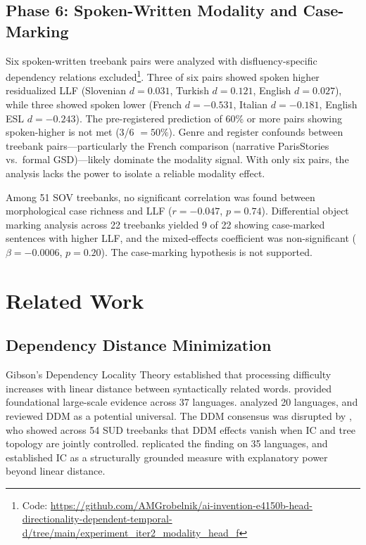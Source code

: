 \documentclass[11pt,letterpaper]{article}
\begin{document}
\subsection{Phase 6: Spoken-Written Modality and Case-Marking}

Six spoken-written treebank pairs were analyzed with disfluency-specific dependency relations excluded\footnote{Code: \url{https://github.com/AMGrobelnik/ai-invention-e4150b-head-directionality-dependent-temporal-d/tree/main/experiment_iter2_modality_head_f}}. Three of six pairs showed spoken higher residualized LLF (Slovenian $d = 0.031$, Turkish $d = 0.121$, English $d = 0.027$), while three showed spoken lower (French $d = -0.531$, Italian $d = -0.181$, English ESL $d = -0.243$). The pre-registered prediction of 60\% or more pairs showing spoken-higher is not met (3/6 $= 50\%$). Genre and register confounds between treebank pairs---particularly the French comparison (narrative ParisStories vs.\ formal GSD)---likely dominate the modality signal. With only six pairs, the analysis lacks the power to isolate a reliable modality effect.

Among 51 SOV treebanks, no significant correlation was found between morphological case richness and LLF ($r = -0.047$, $p = 0.74$). Differential object marking analysis across 22 treebanks yielded 9 of 22 showing case-marked sentences with higher LLF, and the mixed-effects coefficient was non-significant ($\beta = -0.0006$, $p = 0.20$). The case-marking hypothesis is not supported.


\section{Related Work}
\label{sec:related}

\subsection{Dependency Distance Minimization}

Gibson's Dependency Locality Theory \citep{Gibson1998, Gibson2000} established that processing difficulty increases with linear distance between syntactically related words. \citet{Futrell2015} provided foundational large-scale evidence across 37 languages. \citet{Liu2008} analyzed 20 languages, and \citet{Temperley2018} reviewed DDM as a potential universal. The DDM consensus was disrupted by \citet{Yadav2022}, who showed across 54 SUD treebanks that DDM effects vanish when IC and tree topology are jointly controlled. \citet{Dyer2023} replicated the finding on 35 languages, and \citet{Aggarwal2025} established IC as a structurally grounded measure with explanatory power beyond linear distance.
\end{document}
